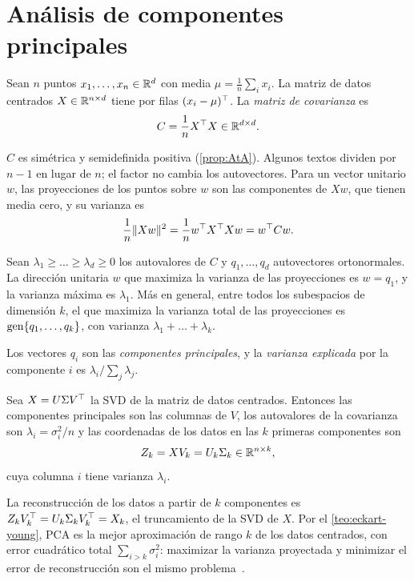 \section{Análisis de componentes principales}

\begin{definicion}
Sean $n$ puntos $x_1,\dots,x_n\in\mathbb{R}^{d}$ con media $\mu=\frac1n\sum_ix_i$. La matriz de datos centrados $X\in\mathbb{R}^{n\times d}$ tiene por filas $(x_i-\mu)^{\top}$. La \emph{matriz de covarianza} es
\[
C=\frac{1}{n}X^{\top} X\in\mathbb{R}^{d\times d}.
\]
\end{definicion}

$C$ es simétrica y semidefinida positiva (\cref{prop:AtA}). Algunos textos dividen por $n-1$ en lugar de $n$; el factor no cambia los autovectores. Para un vector unitario $w$, las proyecciones de los puntos sobre $w$ son las componentes de $Xw$, que tienen media cero, y su varianza es
\[
\frac1n\lVert Xw\rVert^{2}=\frac1n w^{\top} X^{\top} Xw=w^{\top} Cw.
\]

\begin{teorema}\label{teo:pca}
Sean $\lambda_1\ge\dots\ge\lambda_d\ge 0$ los autovalores de $C$ y $q_1,\dots,q_d$ autovectores ortonormales. La dirección unitaria $w$ que maximiza la varianza de las proyecciones es $w=q_1$, y la varianza máxima es $\lambda_1$. Más en general, entre todos los subespacios de dimensión $k$, el que maximiza la varianza total de las proyecciones es $\operatorname{gen}\{q_1,\dots,q_k\}$, con varianza $\lambda_1+\dots+\lambda_k$.
\end{teorema}

Los vectores $q_i$ son las \emph{componentes principales}, y la \emph{varianza explicada} por la componente $i$ es $\lambda_i/\sum_j\lambda_j$.

\begin{teorema}\label{teo:svd-pca}
Sea $X=U\Sigma V^{\top}$ la SVD de la matriz de datos centrados. Entonces las componentes principales son las columnas de $V$, los autovalores de la covarianza son $\lambda_i=\sigma_i^{2}/n$ y las coordenadas de los datos en las $k$ primeras componentes son
\[
Z_k=XV_k=U_k\Sigma_k\in\mathbb{R}^{n\times k},
\]
cuya columna $i$ tiene varianza $\lambda_i$.
\end{teorema}

La reconstrucción de los datos a partir de $k$ componentes es $Z_kV_k^{\top}=U_k\Sigma_kV_k^{\top}=X_k$, el truncamiento de la SVD de $X$. Por el \cref{teo:eckart-young}, PCA es la mejor aproximación de rango $k$ de los datos centrados, con error cuadrático total $\sum_{i>k}\sigma_i^{2}$: maximizar la varianza proyectada y minimizar el error de reconstrucción son el mismo problema~\cite[§10.3]{mml}.

